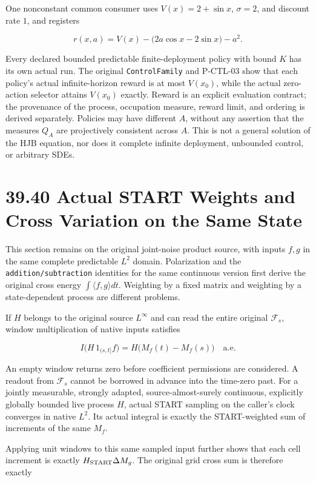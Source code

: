 \documentclass[
  english,
  11pt,
  oneside]{book}
\begin{document}
One nonconstant common consumer uses \(V(x)=2+\sin x\), \(\sigma=2\), and discount rate \(1\), and registers

\[r(x,a)=V(x)-\bigl(2a\cos x-2\sin x\bigr)-a^2.\]

Every declared bounded predictable finite-deployment policy with bound \(K\) has its own actual run. The original \nolinkurl{ControlFamily} and P-CTL-03 show that each policy's actual infinite-horizon reward is at most \(V(x_0)\), while the actual zero-action selector attains \(V(x_0)\) exactly. Reward is an explicit evaluation contract; the provenance of the process, occupation measure, reward limit, and ordering is derived separately. Policies may have different \(A\), without any assertion that the measures \(Q_A\) are projectively consistent across \(A\). This is not a general solution of the HJB equation, nor does it complete infinite deployment, unbounded control, or arbitrary SDEs.

\section{39.40 Actual START Weights and Cross Variation on the Same State}\label{actual-start-weights-and-cross-variation-on-the-same-state}

This section remains on the original joint-noise product source, with inputs \(f,g\) in the same complete predictable \(L^2\) domain. Polarization and the \nolinkurl{addition/subtraction} identities for the same continuous version first derive the original cross energy \(\int\langle f,g\rangle dt\). Weighting by a fixed matrix and weighting by a state-dependent process are different problems.

If \(H\) belongs to the original source \(L^\infty\) and can read the entire original \(\mathcal F_s\), window multiplication of native inputs satisfies

\[I\bigl(H\,1_{(s,t]} f\bigr)=H\bigl(M_f(t)-M_f(s)\bigr)
\quad\text{a.e.}\]

An empty window returns zero before coefficient permissions are considered. A readout from \(\mathcal F_s\) cannot be borrowed in advance into the time-zero past. For a jointly measurable, strongly adapted, source-almost-surely continuous, explicitly globally bounded live process \(H\), actual START sampling on the caller's clock converges in native \(L^2\). Its actual integral is exactly the START-weighted sum of increments of the same \(M_f\).

Applying unit windows to this same sampled input further shows that each cell increment is exactly \(H_{\rm START}\Delta M_g\). The original grid cross sum is therefore exactly
\end{document}
